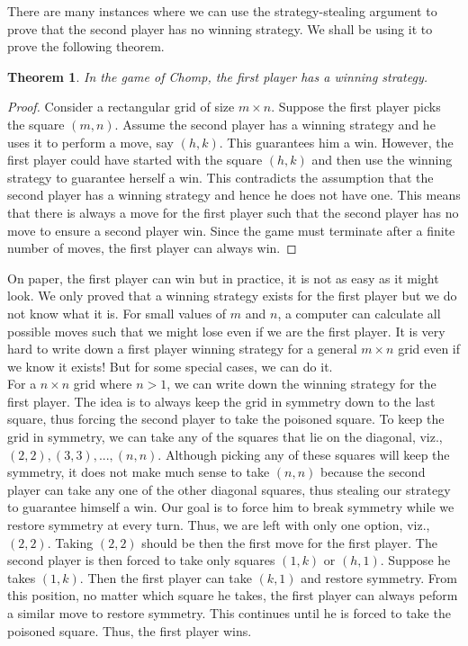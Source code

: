 \documentclass[a4paper, 12pt]{article}
\newtheorem{theorem}{Theorem}[section] %
\theoremstyle{remark} %
\begin{document}
There are many instances where we can use the strategy-stealing argument to prove that the second player has no winning strategy. We shall be using it to prove the following theorem.

\begin{theorem}
	In the game of Chomp, the first player has a winning strategy.
\end{theorem}

\begin{proof}
	Consider a rectangular grid of size $m\times n$. Suppose the first player picks the square $(m,n)$. Assume the second player has a winning strategy and he uses it to perform a move, say $(h,k)$. This guarantees him a win. However, the first player could have started with the square $(h,k)$ and then use the winning strategy to guarantee herself a win. This contradicts the assumption that the second player has a winning strategy and hence he does not have one. This means that there is always a move for the first player such that the second player has no move to ensure a second player win. Since the game must terminate after a finite number of moves, the first player can always win.
\end{proof}

On paper, the first player can win but in practice, it is not as easy as it might look. We only proved that a winning strategy exists for the first player but we do not know what it is. For small values of $m$ and $n$, a computer can calculate all possible moves such that we might lose even if we are the first player. It is very hard to write down a first player winning strategy for a general $m \times n$ grid even if we know it exists! But for some special cases, we can do it.\\

For a $n \times n$ grid where $n>1$, we can write down the winning strategy for the first player. The idea is to always keep the grid in symmetry down to the last square, thus forcing the second player to take the poisoned square. To keep the grid in symmetry, we can take any of the squares that lie on the diagonal, viz., $(2,2), (3,3), ... ,(n,n)$. Although picking any of these squares will keep the symmetry, it does not make much sense to take $(n,n)$ because the second player can take any one of the other diagonal squares, thus stealing our strategy to guarantee himself a win. Our goal is to force him to break symmetry while we restore symmetry at every turn. Thus, we are left with only one option, viz., $(2,2)$. Taking $(2,2)$ should be then the first move for the first player. The second player is then forced to take only squares $(1, k)$ or $(h, 1)$. Suppose he takes $(1, k)$. Then the first player can take $(k,1)$ and restore symmetry. From this position, no matter which square he takes, the first player can always peform a similar move to restore symmetry. This continues until he is forced to take the poisoned square. Thus, the first player wins.\\
\end{document}
